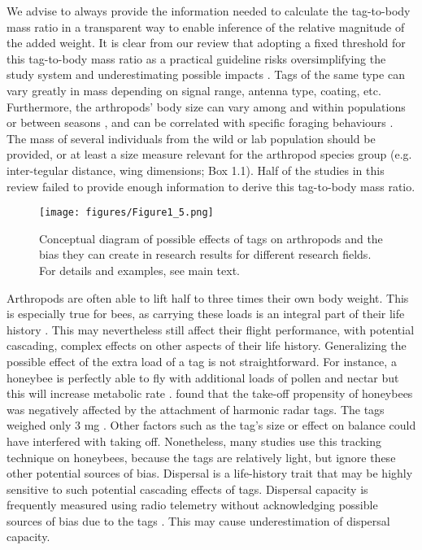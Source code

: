\documentclass[10pt, twoside]{book} %
\begin{document}
	We advise to always provide the information needed to calculate the tag-to-body mass ratio in a transparent way to enable inference of the relative magnitude of the added weight. It is clear from our review that adopting a fixed threshold for this tag-to-body mass ratio as a practical guideline risks oversimplifying the study system and underestimating possible impacts \citep{portugal2018}. Tags of the same type can vary greatly in mass depending on signal range, antenna type, coating, etc. Furthermore, the arthropods' body size can vary among and within populations or between seasons \citep[e.g. for honeybees:][]{sauthier2017}, and can be correlated with specific foraging behaviours \citep{peat2005}. The mass of several individuals from the wild or lab population should be provided, or at least a size measure relevant for the arthropod species group (e.g. inter-tegular distance, wing dimensions; Box 1.1). Half of the studies in this review failed to provide enough information to derive this tag-to-body mass ratio.\\
	
	\begin{figure}[hb!]
		\begin{center}
			\texttt{[image: figures/Figure1\_5.png]}
		\end{center}
		\begin{footnotesize}
			\caption{Conceptual diagram of possible effects of tags on arthropods and the bias they can create in research results for different research fields. For details and examples, see main text. \label{fig1.5}}
		\end{footnotesize}
	\end{figure}
	
	Arthropods are often able to lift half to three times their own body weight. This is especially true for bees, as carrying these loads is an integral part of their life history \citep{boiteau2004}. This may nevertheless still affect their flight performance, with potential cascading, complex effects on other aspects of their life history. Generalizing the possible effect of the extra load of a tag is not straightforward. For instance, a honeybee is perfectly able to fly with additional loads of pollen and nectar but this will increase metabolic rate \citep{wolf1989, feuerbacher2003}. \citet{kim2016} found that the take-off propensity of honeybees was negatively affected by the attachment of harmonic radar tags. The tags weighed only 3 mg \citep[about 3$\%$ of their body mass,][]{osborne1997}. Other factors such as the tag's size or effect on balance could have interfered with taking off. Nonetheless, many studies use this tracking technique on honeybees, because the tags are relatively light, but ignore these other potential sources of bias. Dispersal is a life-history trait that may be highly sensitive to such potential cascading effects of tags. Dispersal capacity is frequently measured using radio telemetry without acknowledging possible sources of bias due to the tags \citep[e.g. in][]{kelly2010, chiari2013, thomaes2018}. This may cause underestimation of dispersal capacity.\\
	
\end{document}
